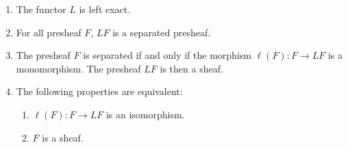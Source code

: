 \documentclass[12pt]{article}
\theoremstyle{remark}
\theoremstyle{definition}
\begin{document}
\begin{prop}[Proposition 3.2]
\begin{enumerate}%
\item The functor $L$ is left exact.

\item For all presheaf $F$, $LF$ is a separated presheaf.

\item The presheaf $F$ is separated if and only if the morphism $\ell(F):F\to LF$ is a monomorphism. The presheaf $LF$ is then a sheaf.

\item The following properties are equivalent:
\begin{enumerate}
\item $\ell(F):F\to LF$ is an isomorphism.
\item $F$ is a sheaf.
\end{enumerate}
\end{enumerate}
\end{prop}
\end{document}
